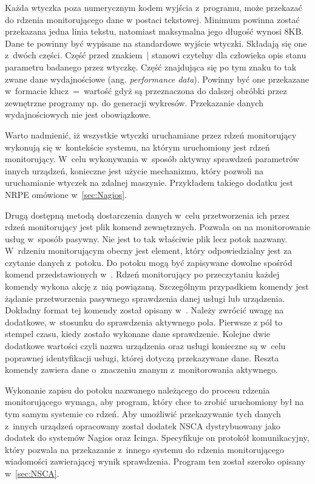 Każda wtyczka poza numerycznym kodem wyjścia z~programu, może
przekazać do rdzenia monitorującego dane w postaci tekstowej. Minimum
powinna zostać przekazana jedna linia tekstu, natomiast maksymalna
jego długość wynosi 8KB. Dane te powinny być wypisane na standardowe
wyjście wtyczki. Składają się one z~dwóch części. Część przed
znakiem~| stanowi czytelny dla człowieka opis stanu parametru badanego
przez wtyczkę. Część znajdująca się po tym znaku to tak zwane dane
wydajnościowe (ang. {\em performance data}). Powinny być one
przekazane w~formacie klucz~=~wartość gdyż są przeznaczona do dalszej
obróbki przez zewnętrzne programy np. do generacji
wykresów. Przekazanie danych wydajnościowych nie jest obowiązkowe.

Warto nadmienić, iż wszystkie wtyczki uruchamiane przez rdzeń
monitorujący wykonują się w~kontekście systemu, na którym uruchomiony
jest rdzeń monitorujący. W~celu wykonywania w~sposób aktywny sprawdzeń
parametrów innych urządzeń, konieczne jest użycie mechanizmu, który
pozwoli na uruchamianie wtyczek na zdalnej maszynie. Przykładem
takiego dodatku jest NRPE omówione w~\ref{sec:Nagios}.

Drugą dostępną metodą dostarczenia danych w~celu przetworzenia ich
przez rdzeń monitorujący jest plik komend zewnętrznych. Pozwala on na
monitorowanie usług w~sposób pasywny. Nie jest to tak właściwie plik
lecz potok nazwany. W~rdzeniu monitorującym obecny jest element, który
odpowiedzialny jest za czytanie danych z~potoku. Do potoku mogą być
zapisywane dowolne spośród komend przedstawionych
w~\cite[412-436]{www:IcingaDoc}. Rdzeń monitorujący po przeczytaniu
każdej komendy wykona akcję z~nią powiązaną. Szczególnym przypadkiem
komendy jest żądanie przetworzenia pasywnego sprawdzenia danej usługi
lub urządzenia. Dokładny format tej komendy został opisany
w~\cite[296-299]{www:IcingaDoc}. Należy zwrócić uwagę na dodatkowe,
w~stosunku do sprawdzenia aktywnego pola. Pierwsze z pól to stempel
czasu, kiedy zostało wykonane dane sprawdzenie. Kolejne dwie dodatkowe
wartości czyli nazwa urządzenia oraz usługi konieczne są w~celu
poprawnej identyfikacji usługi, której dotyczą przekazywane
dane. Reszta komendy zawiera dane o~znaczeniu znanym z~monitorowania
aktywnego.

Wykonanie zapisu do potoku nazwanego należącego do procesu rdzenia
monitorującego wymaga, aby program, który chce to zrobić uruchomiony
był na tym samym systemie co rdzeń. Aby umożliwić przekazywanie tych
danych z~innych urządzeń opracowany został dodatek NSCA dystrybuowany
jako dodatek do systemów Nagios oraz Icinga. Specyfikuje on protokół
komunikacyjny, który pozwala na przekazanie z~innego systemu do
rdzenia monitorującego wiadomości zawierającej wynik
sprawdzenia. Program ten został szeroko opisany w~\ref{sec:NSCA}.

